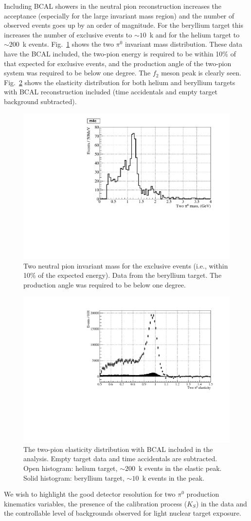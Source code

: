 Including BCAL showers in the neutral pion reconstruction increases
the acceptance (especially for the large invariant mass region) and the number
of observed events goes up by an order of magnitude. For the beryllium target
this increases the number of exclusive events to $\sim 10$~k and for
the helium target to $\sim 200$~k events. Fig.~\ref{fig:bemass}
shows the two $\pi^0$ invariant mass distribution. These data have the BCAL included,
the two-pion energy is required to be within
10\% of that expected for exclusive events, and the production angle
of the two-pion system was required to be below one degree. The $f_2$ meson
peak is clearly seen. Fig.~\ref{fig:beheelast} shows the elasticity
distribution for both helium and beryllium targets with BCAL
reconstruction included (time accidentals and empty target
background subtracted).
\begin{figure}[!h]
\centering\includegraphics[width=4.75in]{figures/be_mass.pdf}
\caption{Two neutral pion invariant mass for the exclusive events
  (i.e., within 10\% of the expected energy). Data from the beryllium target. The production angle
  was required to be below one degree.
\label{fig:bemass}}
\end{figure}
\begin{figure}[!h]
\centering\includegraphics[width=4.5in]{figures/hebe_elast.pdf}
\caption{The two-pion elasticity distribution with BCAL included in the
  analysis. Empty target data and time accidentals are subtracted. Open
  histogram: helium target, $\sim 200$~k events in the elastic
  peak. Solid histogram: beryllium target, $\sim 10$~k events in
  the peak.
\label{fig:beheelast}}
\end{figure}

We wish to highlight the good detector
resolution for two $\pi^0$ production kinematics variables, the
presence of the calibration process ($K_S$) in the data and the
controllable level of backgrounds observed for light nuclear target
exposure.
